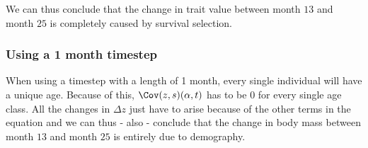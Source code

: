 We can thus conclude that the change in trait value between month $13$ and month $25$ is completely caused by survival selection.

\subsubsection{Using a 1 month timestep}
When using a timestep with a length of 1 month, every single individual will have a unique age. Because of this, $\Cov(z,s)(\alpha,t)$ has to be $0$ for every single age class. All the changes in $\Delta z$ just have to arise because of the other terms in the equation and we can thus - also - conclude that the change in body mass between month $13$ and month $25$ is entirely due to demography.